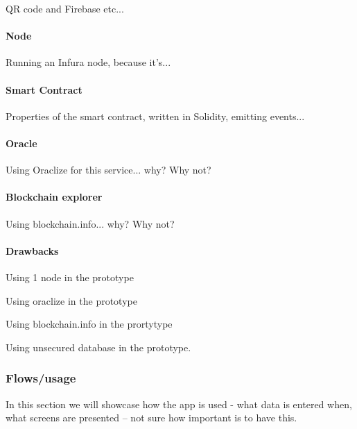 QR code and Firebase etc...
% 
\paragraph{Node}
Running an Infura node, because it's...
% 
\paragraph{Smart Contract}
Properties of the smart contract, written in Solidity, emitting events...
% 
\paragraph{Oracle}
Using Oraclize for this service... why? Why not?
% 
\paragraph{Blockchain explorer}
Using blockchain.info... why? Why not?

\paragraph{Drawbacks}
Using 1 node in the prototype

Using oraclize in the prototype

Using blockchain.info in the prortytype

Using unsecured database in the prototype.



\subsubsection{Flows/usage}
% 
In this section we will showcase how the app is used - what data is entered when, what screens are presented -- not sure how important is to have this.


